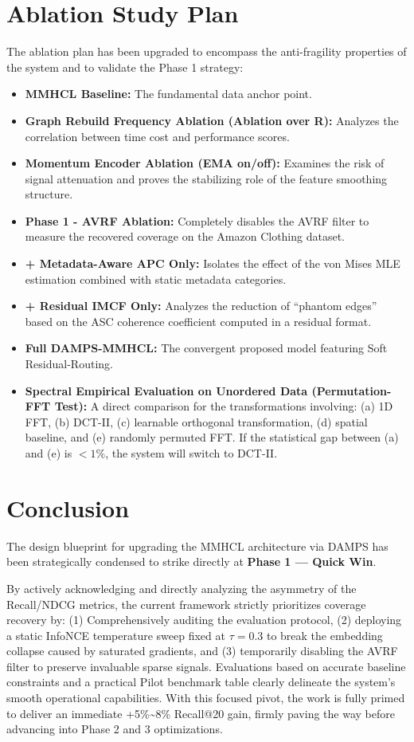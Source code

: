 \documentclass[12pt, a4paper]{article}
\begin{document}
\section{Ablation Study Plan}
The ablation plan has been upgraded to encompass the anti-fragility properties of the system and to validate the Phase 1 strategy:
\begin{itemize}
    \item \textbf{MMHCL Baseline:} The fundamental data anchor point.
    \item \textbf{Graph Rebuild Frequency Ablation (Ablation over R):} Analyzes the correlation between time cost and performance scores.
    \item \textbf{Momentum Encoder Ablation (EMA on/off):} Examines the risk of signal attenuation and proves the stabilizing role of the feature smoothing structure.
    \item \textbf{Phase 1 - AVRF Ablation:} Completely disables the AVRF filter to measure the recovered coverage on the Amazon Clothing dataset.
    \item \textbf{+ Metadata-Aware APC Only:} Isolates the effect of the von Mises MLE estimation combined with static metadata categories.
    \item \textbf{+ Residual IMCF Only:} Analyzes the reduction of ``phantom edges'' based on the ASC coherence coefficient computed in a residual format.
    \item \textbf{Full DAMPS-MMHCL:} The convergent proposed model featuring Soft Residual-Routing.
    \item \textbf{Spectral Empirical Evaluation on Unordered Data (Permutation-FFT Test):} A direct comparison for the transformations involving: (a) 1D FFT, (b) DCT-II, (c) learnable orthogonal transformation, (d) spatial baseline, and (e) randomly permuted FFT. If the statistical gap between (a) and (e) is $< 1\%$, the system will switch to DCT-II.
\end{itemize}

\section{Conclusion}
The design blueprint for upgrading the MMHCL architecture via DAMPS has been strategically condensed to strike directly at \textbf{Phase 1 — Quick Win}.

By actively acknowledging and directly analyzing the asymmetry of the Recall/NDCG metrics, the current framework strictly prioritizes coverage recovery by: (1) Comprehensively auditing the evaluation protocol, (2) deploying a static InfoNCE temperature sweep fixed at $\tau = 0.3$ to break the embedding collapse caused by saturated gradients, and (3) temporarily disabling the AVRF filter to preserve invaluable sparse signals. Evaluations based on accurate baseline constraints and a practical Pilot benchmark table clearly delineate the system's smooth operational capabilities. With this focused pivot, the work is fully primed to deliver an immediate +5\%\textasciitilde8\% Recall@20 gain, firmly paving the way before advancing into Phase 2 and 3 optimizations.
\end{document}
